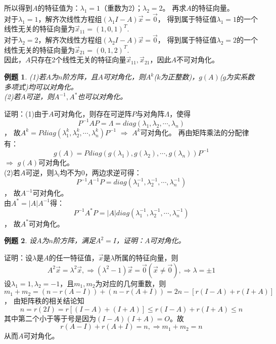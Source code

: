 \documentclass[a4paper]{book}
\newtheorem{eg}{例题}[chapter]
\begin{document}
所以得到$A$的特征值为：$\lambda_1=1$（重数为2）；$\lambda_2=2$。
再求$A$的特征向量。\\
对于$\lambda_1=1$，解齐次线性方程组$(\lambda_1 I-A)\vec{x}=\vec{0}$，
得到属于特征值$\lambda_1=1$的一个线性无关的特征向量为$\vec{x}_{11}=(1,0,1)^T$.\\
对于$\lambda_2=2$，解齐次线性方程组$(\lambda_2 I-A)\vec{x}=\vec{0}$，
得到属于特征值$\lambda_2=2$的一个线性无关的特征向量为$\vec{x}_{21}=(0,1,2)^T$.\\
因此，$A$只存在2个线性无关的特征向量$\vec{x}_{11},\vec{x}_{21}$，因此$A$不可对角化。

\begin{eg}
(1)若$A$为$n$阶方阵，且$A$可对角化，则$A^k$($k$为正整数)，$g(A)$($g$为实系数多项式)均可以对角化。\\
(2)若$A$可逆，则$A^{-1},A^{*}$也可以对角化。
\end{eg}
证明：(1)由于$A$可对角化，则存在可逆阵$P$与对角阵$\Lambda$，使得
$$P^{-1}AP=\Lambda=diag(\lambda_1,\lambda_2,\cdots,\lambda_n)$$，
故$A^k=Pdiag(\lambda_1^k,\lambda_2^k,\cdots,\lambda_n^k)P^{-1}$ $\Rightarrow$ $A^k$可对角化。
再由矩阵乘法的分配律有：
$$g(A) = P diag(g(\lambda_1),g(\lambda_2),\cdots,g(\lambda_n)) P^{-1}$$
$\Rightarrow$ $g(A)$可对角化。\\
(2)若$A$可逆，则$\lambda_i$均不为0，两边求逆可得：
$$P^{-1}A^{-1}P=diag(\lambda_1^{-1},\lambda_2^{-1},\cdots,\lambda_n^{-1})$$，
故$A^{-1}$可对角化。\\
由$A^*=|A|A^{-1}$得：
$$P^{-1}A^{*}P=|A|diag(\lambda_1^{-1},\lambda_2^{-1},\cdots,\lambda_n^{-1})$$，
故$A^*$可对角化。

\begin{eg}
设$A$为$n$阶方阵，满足$A^2=I$，证明：$A$可对角化。
\end{eg}
证明：设$\lambda$是$A$的任一特征值，$\vec{x}$是$\lambda$所属的特征向量，则
$$A^2\vec{x}=\lambda^2\vec{x},\Rightarrow(\lambda^2-1)\vec{x}=\vec{0}
(\vec{x}\neq\vec{0}),\Rightarrow\lambda=\pm 1$$
设$\lambda_1=1,\lambda_2=-1$，且$m_1,m_2$为对应的几何重数，则
$$m_1+m_2=(n-r(A-I))+(n-r(A+I))=2n-[r(I-A)+r(I+A)]$$，
由矩阵秩的相关结论知
$$n=r(2I)=r[(I-A)+(I+A)]\leq r(I-A)+r(I+A)\leq n$$
其中第二个小于等于号是因为$(I-A)(I+A)=O$。故
$$r(A-I)+r(A+I)=n,\Rightarrow m_1+m_2=n$$
从而$A$可对角化。
\end{document}
